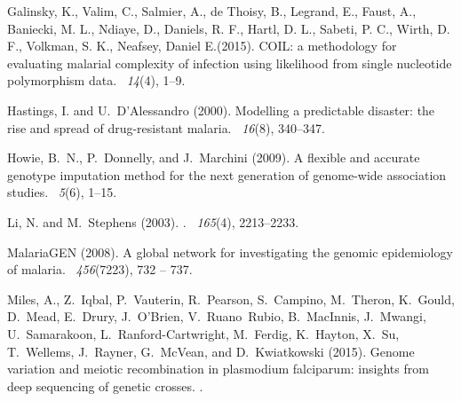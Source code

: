 \documentclass{bioinfo}
\begin{document}
\begin{thebibliography}{}
Galinsky, K., Valim, C., Salmier, A., de Thoisy, B., Legrand, E., Faust, A., Baniecki, M. L., Ndiaye, D., Daniels, R. F., Hartl, D. L., Sabeti, P. C., Wirth, D. F., Volkman, S. K., Neafsey, Daniel E.(2015).
\newblock COIL: a methodology for evaluating malarial complexity of infection using likelihood from single nucleotide polymorphism data.
~{\em14\/}(4), 1--9.

Hastings, I. and U.~D'Alessandro (2000).
\newblock Modelling a predictable disaster: the rise and spread of
  drug-resistant malaria.
~{\em 16\/}(8), 340--347.

Howie, B.~N., P.~Donnelly, and J.~Marchini (2009).
\newblock A flexible and accurate genotype imputation method for the next
  generation of genome-wide association studies.
~{\em 5\/}(6), 1--15.

Li, N. and M.~Stephens (2003).
.
~{\em 165\/}(4), 2213--2233.

MalariaGEN (2008).
\newblock A global network for investigating the genomic epidemiology of
  malaria.
~{\em 456\/}(7223), 732 -- 737.

Miles, A., Z.~Iqbal, P.~Vauterin, R.~Pearson, S.~Campino, M.~Theron, K.~Gould,
  D.~Mead, E.~Drury, J.~O{\textquoteright}Brien, V.~Ruano~Rubio, B.~MacInnis,
  J.~Mwangi, U.~Samarakoon, L.~Ranford-Cartwright, M.~Ferdig, K.~Hayton, X.~Su,
  T.~Wellems, J.~Rayner, G.~McVean, and D.~Kwiatkowski (2015).
\newblock Genome variation and meiotic recombination in plasmodium falciparum:
  insights from deep sequencing of genetic crosses.
.


\end{thebibliography}
\end{document}
